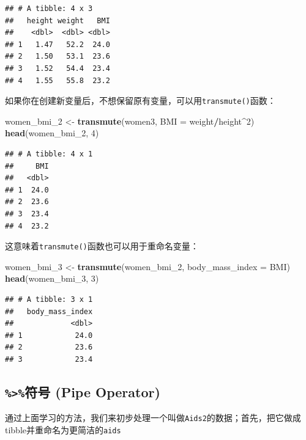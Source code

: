 \documentclass[]{book}
\newenvironment{Shaded}{\begin{snugshade}}{\end{snugshade}}
\newcommand{\DataTypeTok}[1]{\textcolor[rgb]{0.13,0.29,0.53}{#1}}
\newcommand{\DecValTok}[1]{\textcolor[rgb]{0.00,0.00,0.81}{#1}}
\newcommand{\KeywordTok}[1]{\textcolor[rgb]{0.13,0.29,0.53}{\textbf{#1}}}
\newcommand{\NormalTok}[1]{#1}
\newcommand{\OperatorTok}[1]{\textcolor[rgb]{0.81,0.36,0.00}{\textbf{#1}}}
\newcommand{\StringTok}[1]{\textcolor[rgb]{0.31,0.60,0.02}{#1}}
\begin{document}
\begin{verbatim}
## # A tibble: 4 x 3
##   height weight   BMI
##    <dbl>  <dbl> <dbl>
## 1   1.47   52.2  24.0
## 2   1.50   53.1  23.6
## 3   1.52   54.4  23.4
## 4   1.55   55.8  23.2
\end{verbatim}

如果你在创建新变量后，不想保留原有变量，可以用\texttt{transmute()}函数：

\begin{Shaded}
\begin{Highlighting}[]
\NormalTok{women_bmi_}\DecValTok{2}\NormalTok{ <-}\StringTok{ }\KeywordTok{transmute}\NormalTok{(women3, }\DataTypeTok{BMI =}\NormalTok{ weight}\OperatorTok{/}\NormalTok{height}\OperatorTok{^}\DecValTok{2}\NormalTok{)}
\KeywordTok{head}\NormalTok{(women_bmi_}\DecValTok{2}\NormalTok{, }\DecValTok{4}\NormalTok{)}
\end{Highlighting}
\end{Shaded}

\begin{verbatim}
## # A tibble: 4 x 1
##     BMI
##   <dbl>
## 1  24.0
## 2  23.6
## 3  23.4
## 4  23.2
\end{verbatim}

这意味着\texttt{transmute()}函数也可以用于重命名变量：

\begin{Shaded}
\begin{Highlighting}[]
\NormalTok{women_bmi_}\DecValTok{3}\NormalTok{ <-}\StringTok{ }\KeywordTok{transmute}\NormalTok{(women_bmi_}\DecValTok{2}\NormalTok{, }\DataTypeTok{body_mass_index =}\NormalTok{ BMI)}
\KeywordTok{head}\NormalTok{(women_bmi_}\DecValTok{3}\NormalTok{, }\DecValTok{3}\NormalTok{)}
\end{Highlighting}
\end{Shaded}

\begin{verbatim}
## # A tibble: 3 x 1
##   body_mass_index
##             <dbl>
## 1            24.0
## 2            23.6
## 3            23.4
\end{verbatim}

\hypertarget{-pipe-operator}{%
\subsection{\texorpdfstring{\texttt{\%\textgreater{}\%}符号 (Pipe Operator)}{\%\textgreater{}\%符号 (Pipe Operator)}}\label{-pipe-operator}}

通过上面学习的方法，我们来初步处理一个叫做\texttt{Aids2}的数据；首先，把它做成tibble并重命名为更简洁的\texttt{aids}
\end{document}
